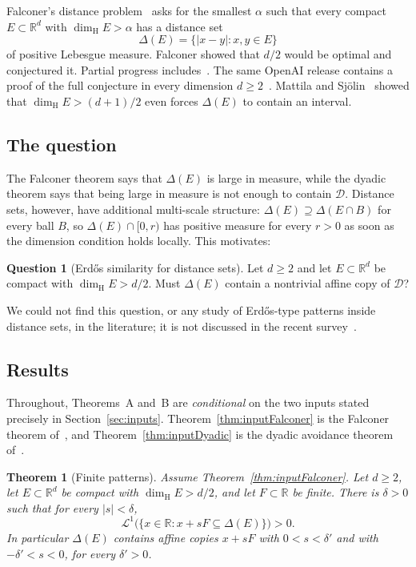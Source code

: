 \documentclass[11pt]{amsart}
\newtheorem{maintheorem}{Theorem}
\theoremstyle{definition}
\newtheorem{question}{Question}
\theoremstyle{remark}
\newcommand{\R}{\mathbb{R}}
\newcommand{\dimH}{\dim_{\mathrm H}}
\newcommand{\Lm}{\mathcal{L}}
\newcommand{\Dy}{\mathcal{D}}
\begin{document}
Falconer's distance problem~\cite{Falconer1985} asks for the smallest $\alpha$ such that every
compact $E\subset\R^d$ with $\dimH E>\alpha$ has a distance set
\[
  \Delta(E)=\{|x-y|:x,y\in E\}
\]
of positive Lebesgue measure. Falconer showed that $d/2$ would be optimal and conjectured it.
Partial progress includes~\cite{Wolff1999,Erdogan2005,GIOW2020}. The same OpenAI release contains a
proof of the full conjecture in every dimension $d\ge2$~\cite{OAIFalconer}.
Mattila and Sj\"olin~\cite{MattilaSjolin1999} showed that $\dimH E>(d+1)/2$ even forces
$\Delta(E)$ to contain an interval.

\subsection{The question}
The Falconer theorem says that $\Delta(E)$ is large in measure, while the dyadic theorem says
that being large in measure is not enough to contain $\Dy$. Distance sets, however, have
additional multi-scale structure: $\Delta(E)\supseteq\Delta(E\cap B)$ for every ball $B$, so
$\Delta(E)\cap[0,r)$ has positive measure for every $r>0$ as soon as the dimension condition
holds locally. This motivates:

\begin{question}[Erd\H{o}s similarity for distance sets]\label{q:main}
Let $d\ge2$ and let $E\subset\R^d$ be compact with $\dimH E>d/2$. Must $\Delta(E)$ contain a
nontrivial affine copy of $\Dy$?
\end{question}

We could not find this question, or any study of Erd\H{o}s-type patterns inside distance sets,
in the literature; it is not discussed in the recent survey~\cite{JungLaiMooroogen2024}.

\subsection{Results}
Throughout, Theorems~A and~B are \emph{conditional} on the two inputs stated precisely in
Section~\ref{sec:inputs}. Theorem~\ref{thm:inputFalconer} is the Falconer theorem of~\cite{OAIFalconer}, and
Theorem~\ref{thm:inputDyadic} is the dyadic avoidance theorem of~\cite{OAIDyadic}.

\begin{maintheorem}[Finite patterns]\label{thm:A}
Assume Theorem~\ref{thm:inputFalconer}. Let $d\ge2$, let $E\subset\R^d$ be compact with $\dimH E>d/2$, and let
$F\subset\R$ be finite. There is $\delta>0$ such that for every $|s|<\delta$,
\[
  \Lm^1\bigl(\{x\in\R : x+sF\subseteq\Delta(E)\}\bigr)>0 .
\]
In particular $\Delta(E)$ contains affine copies $x+sF$ with $0<s<\delta'$ and with
$-\delta'<s<0$, for every $\delta'>0$.
\end{maintheorem}
\end{document}
